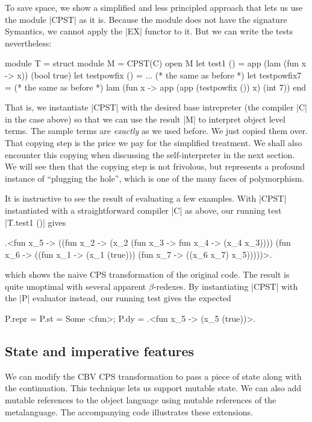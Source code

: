 \documentclass[preprint]{sigplanconf}
\begin{document}
To save space, we show a simplified and less principled approach that
lets us use the module |CPST| as it is. Because the module does not
have the signature Symantics, we cannot apply the |EX| functor to it.
But we can write the tests nevertheless:
\begin{code}
module T = struct
 module M = CPST(C)
 open M
 let test1 () = app (lam (fun x -> x)) (bool true)
 let testpowfix () = ... (* the same as before *)
 let testpowfix7 = (* the same as before *)
    lam (fun x -> app (app (testpowfix ()) x) (int 7))
end
\end{code}
That is, we instantiate |CPST| with the desired base intrepreter (the
compiler |C| in the case above) so that we can use the result |M| to
interpret object level terms. The sample terms are \emph{exactly}
as we used before. We just copied them over. That copying step is the
price we pay for the simplified treatment. We shall also encounter this
copying when discussing the self-interpreter in the next section. We
will see then that the copying step is not frivolous, but represents
a profound instance of 
``plugging the hole'', which is one of the many faces of polymorphism.

It is instructive to see the result of evaluating a few examples. With 
|CPST| instantiated with a straightforward compiler |C| as above, our
running test |T.test1 ()| gives
\begin{code}
.<fun x_5 -> ((fun x_2 -> 
        (x_2 (fun x_3 -> fun x_4 -> (x_4 x_3))))
        (fun x_6 -> ((fun x_1 -> (x_1 (true))) 
        (fun x_7 -> ((x_6 x_7) x_5)))))>.
\end{code}

which shows the naive CPS transformation of the original code. The result is
quite unoptimal with several apparent $\beta$-redexes. 
By instantiating |CPST| with the |P| evaluator instead, our
running test gives the expected
\begin{code}
  P.repr = {P.st = Some <fun>;
            P.dy = .<fun x_5 -> (x_5 (true))>.}
\end{code}

\subsection{State and imperative features}

We can modify the CBV CPS transformation to pass a piece of state along
with the continuation. This technique lets us support mutable state. We
can also add mutable references to the object language using mutable
references of the metalanguage.  The accompanying code illustrates these
extensions.
\end{document}
